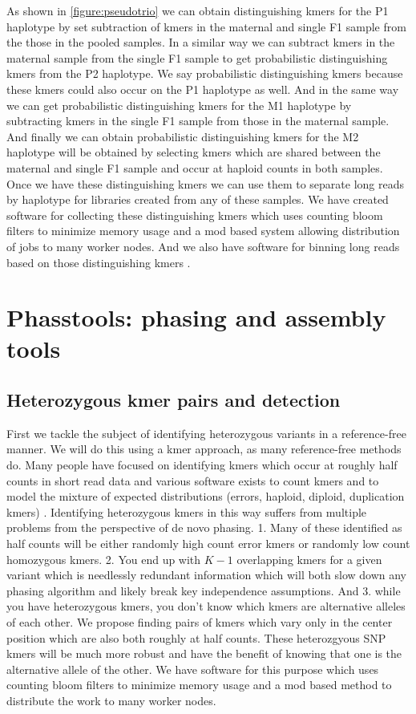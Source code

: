 As shown in \ref{figure:pseudotrio} we can obtain distinguishing kmers for the P1 haplotype by set subtraction of kmers in the maternal and single F1 sample 
from the those in the pooled samples. In a similar way we can subtract kmers in the maternal sample from the single F1 sample to get probabilistic distinguishing 
kmers from the P2 haplotype. We say probabilistic distinguishing kmers because these kmers could also occur on the P1 haplotype as well. And in the same way 
we can get probabilistic distinguishing kmers for the M1 haplotype by subtracting kmers in the single F1 sample from those in the maternal sample. And finally we can obtain 
probabilistic distinguishing kmers for the M2 haplotype will be obtained by selecting kmers which are shared between the maternal and single F1 sample and occur at 
haploid counts in both samples. Once we have these distinguishing kmers we can use them to separate long reads by haplotype for libraries created from any of these samples. 
We have created software for collecting these distinguishing kmers \cite{distinguishing_kmers} which uses counting bloom filters to minimize memory usage 
and a mod based system allowing distribution of jobs to many worker nodes. And we also have software for binning long reads based on those 
distinguishing kmers \cite{long_read_binner}.


\section{Phasstools: phasing and assembly tools}
\subsection{Heterozygous kmer pairs and detection}
First we tackle the subject of identifying heterozygous variants in a reference-free manner. We will do this using a kmer approach, as many reference-free methods do. 
Many people have focused on identifying kmers which occur at roughly half counts in short read data \cite{KAT} and various software exists to count kmers \cite{jellyfish} 
and to model the mixture of expected distributions (errors, haploid, diploid, duplication kmers) \cite{genomescope}. Identifying heterozygous kmers in this way 
suffers from multiple problems from the perspective of de novo phasing. 1. Many of these identified as half counts will be either randomly high count error kmers or randomly low count 
homozygous kmers. 2. You end up with $K-1$ overlapping kmers for a given variant which is needlessly redundant information which will both slow down any phasing algorithm and 
likely break key independence assumptions. And 3. while you have heterozygous kmers, you don't know which kmers are alternative alleles of each other. 
We propose finding pairs of kmers which vary only in the center position which are also both roughly at half counts. These heterozgyous SNP kmers 
will be much more robust and have the benefit of knowing that one is the alternative allele of the other.
We have software for this purpose \cite{het_kmers} which uses counting bloom filters to minimize memory usage and a mod based method to 
distribute the work to many worker nodes.

